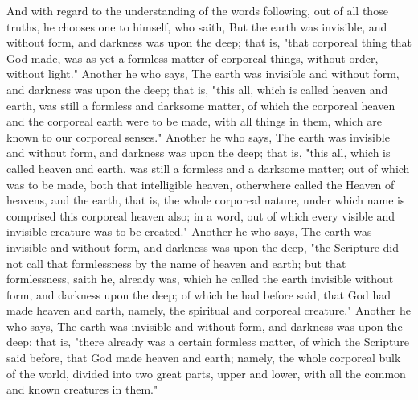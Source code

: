 \documentclass[b5paper,openright,12pt,twoside]{book}
\begin{document}
And with regard to the understanding of the words following, out of all
those truths, he chooses one to himself, who saith, But the earth was
invisible, and without form, and darkness was upon the deep; that is,
"that corporeal thing that God made, was as yet a formless matter of
corporeal things, without order, without light." Another he who says,
The earth was invisible and without form, and darkness was upon the
deep; that is, "this all, which is called heaven and earth, was still
a formless and darksome matter, of which the corporeal heaven and the
corporeal earth were to be made, with all things in them, which are
known to our corporeal senses." Another he who says, The earth was
invisible and without form, and darkness was upon the deep; that is,
"this all, which is called heaven and earth, was still a formless and
a darksome matter; out of which was to be made, both that intelligible
heaven, otherwhere called the Heaven of heavens, and the earth, that is,
the whole corporeal nature, under which name is comprised this corporeal
heaven also; in a word, out of which every visible and invisible
creature was to be created." Another he who says, The earth was
invisible and without form, and darkness was upon the deep, "the
Scripture did not call that formlessness by the name of heaven and
earth; but that formlessness, saith he, already was, which he called the
earth invisible without form, and darkness upon the deep; of which
he had before said, that God had made heaven and earth, namely, the
spiritual and corporeal creature." Another he who says, The earth was
invisible and without form, and darkness was upon the deep; that is,
"there already was a certain formless matter, of which the Scripture
said before, that God made heaven and earth; namely, the whole corporeal
bulk of the world, divided into two great parts, upper and lower, with
all the common and known creatures in them."
\end{document}
